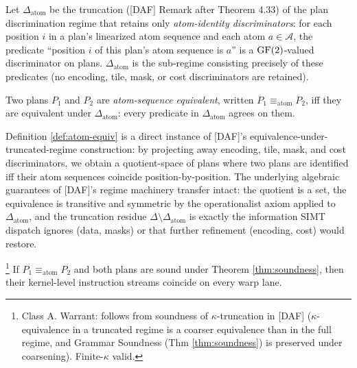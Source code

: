 \begin{definition}
  \label{def:atom-id-regime}
  Let $\Delta_\mathrm{atom}$ be the truncation
  ([DAF] Remark after Theorem 4.33) of the plan
  discrimination regime that retains only
  \emph{atom-identity discriminators}: for each
  position $i$ in a plan's linearized atom sequence
  and each atom $a \in \mathcal{A}$, the predicate
  ``position $i$ of this plan's atom sequence is
  $a$'' is a $\operatorname{GF}(2)$-valued discriminator on plans.
  $\Delta_\mathrm{atom}$ is the sub-regime consisting
  precisely of these predicates (no encoding, tile,
  mask, or cost discriminators are retained).
\end{definition}

\begin{definition}
  \label{def:atom-equiv}
  Two plans $P_1$ and $P_2$ are
  \emph{atom-sequence equivalent}, written $P_1
  \equiv_\mathrm{atom} P_2$, iff they are
  equivalent under $\Delta_\mathrm{atom}$: every
  predicate in $\Delta_\mathrm{atom}$ agrees on
  them.
\end{definition}

Definition \ref{def:atom-equiv} is a direct instance
of [DAF]'s equivalence-under-truncated-regime
construction: by projecting away encoding, tile,
mask, and cost discriminators, we obtain a
quotient-space of plans where two plans are
identified iff their atom sequences coincide
position-by-position. The underlying algebraic
guarantees of [DAF]'s regime machinery transfer
intact: the quotient is a set, the equivalence is
transitive and symmetric by the operationalist
axiom applied to $\Delta_\mathrm{atom}$, and the
truncation residue $\Delta \setminus
\Delta_\mathrm{atom}$ is exactly the information
SIMT dispatch ignores (data, masks) or that
further refinement (encoding, cost) would restore.

\begin{proposition}
  \label{prop:atom-equiv-sound}
  \footnote{Class \textsf{A}. Warrant: follows
  from soundness of $\kappa$-truncation in [DAF]
  ($\kappa$-equivalence in a truncated regime
  is a coarser equivalence than in the full regime,
  and Grammar Soundness (Thm \ref{thm:soundness})
  is preserved under coarsening). Finite-$\kappa$
  valid.}
  If $P_1 \equiv_\mathrm{atom} P_2$ and both plans
  are sound under Theorem \ref{thm:soundness}, then
  their kernel-level instruction streams coincide
  on every warp lane.
\end{proposition}

